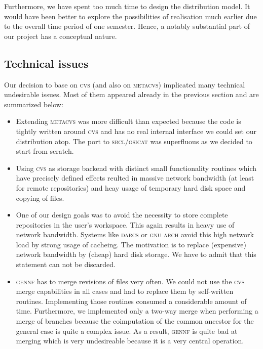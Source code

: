 \documentclass[fleqn, 10pt, a4paper]{report} \usepackage{amssymb}
\newcommand{\GENNF}{\textsc{gennf}}
\begin{document}
Furthermore, we have spent too much time to design the distribution model.
It would have been better to explore the possibilities of realisation
much earlier due to the overall time period of one semester. Hence,
a notably substantial part of our project has a conceptual nature.

\subsection{Technical issues}

Our decision to base on \textsc{cvs} (and also on \textsc{metacvs})
implicated many technical
undesirable issues. Most of them appeared already in the previous
section and are summarized below:

\begin{itemize}
\item Extending \textsc{metacvs} was more difficult than expected
  because the code is tightly written around \textsc{cvs} and has no
  real internal interface we could set our distribution atop.  The
  port to \textsc{sbcl}/\textsc{osicat} was superfluous as we decided
  to start from scratch.
\item Using \textsc{cvs} as storage backend with distinct small
  functionality routines which have precisely defined effects reulted
  in massive network bandwidth (at least for remote repositories) and
  heay usage of temporary hard disk space and copying of files.
\item One of our design goals was to avoid the necessity to store
  complete repositories in the user's workspace. This again results in
  heavy use of network bandwidth. Systems like \textsc{darcs} or
  \textsc{gnu arch} avoid this high network load by strong usage of
  cacheing. The motivation is to replace (expensive) network bandwidth
  by (cheap) hard disk storage. We have to admit that this statement
  can not be discarded.
\item \GENNF{} has to merge revisions of files very often. We could
  not use the \textsc{cvs} merge capabilities in all cases and had to
  replace them by self-written routines. Implementing those routines
  consumed a considerable amount of time.  Furthermore, we implemented
  only a two-way merge when performing a merge of branches because the
  coimputation of the common ancestor for the general case is quite a
  complex issue.  As a result, \GENNF{} is quite bad at merging which
  is very undesireable because it is a very central operation.
\end{itemize}
\end{document}
